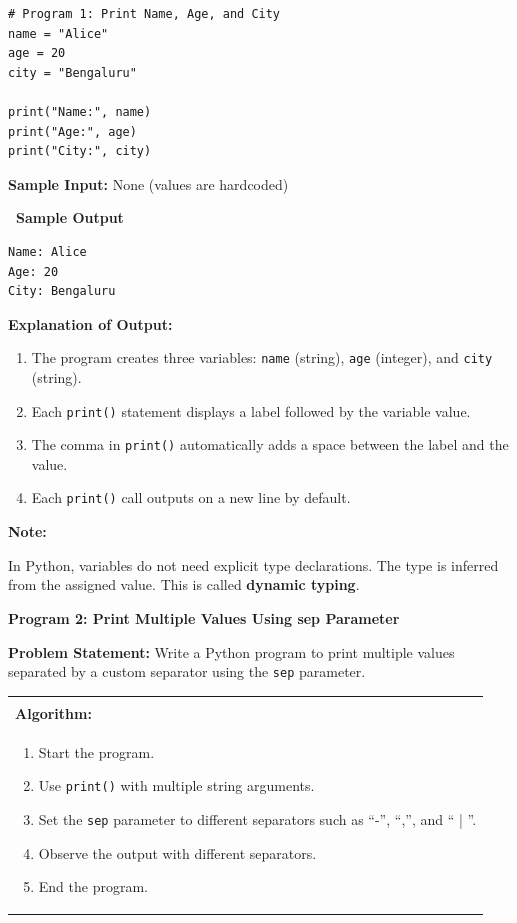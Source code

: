 \documentclass[12pt,a4paper]{article}
\makeatletter
\newcommand{\outhead}{\noindent\colorbox{cmrgreen!25}%
  {\textbf{\small\color{cmrdark}~Sample Output~}}\par\vspace{-1pt}}
\newenvironment{notebox}{%
  \par\vspace{4pt}%
  \noindent\textbf{Note:}\par\vspace{2pt}%
  \begin{minipage}{\linewidth}%
  \small%
}{%
  \end{minipage}\par\vspace{4pt}%
}
\newenvironment{algobox}{%
  \par\vspace{4pt}%
  \noindent\begin{tabular}{@{}p{\linewidth}@{}}%
  \hline\\[-8pt]%
  \textbf{\color{blue!60!black}\small Algorithm:}\\[2pt]%
}{%
  \\[-4pt]\hline%
  \end{tabular}\par\vspace{4pt}%
}
\makeatother
\begin{document}
\begin{lstlisting}
# Program 1: Print Name, Age, and City
name = "Alice"
age = 20
city = "Bengaluru"

print("Name:", name)
print("Age:", age)
print("City:", city)
\end{lstlisting}

\textbf{Sample Input:} None (values are hardcoded)

\outhead
\begin{lstlisting}[style=outputstyle]
Name: Alice
Age: 20
City: Bengaluru
\end{lstlisting}

\textbf{Explanation of Output:}
\begin{enumerate}
  \item The program creates three variables: \texttt{name} (string), \texttt{age} (integer), and \texttt{city} (string).
  \item Each \texttt{print()} statement displays a label followed by the variable value.
  \item The comma in \texttt{print()} automatically adds a space between the label and the value.
  \item Each \texttt{print()} call outputs on a new line by default.
\end{enumerate}

\begin{notebox}
In Python, variables do not need explicit type declarations. The type is inferred from the assigned value. This is called \textbf{dynamic typing}.
\end{notebox}

\vspace{0.5cm}

\textbf{Program 2: Print Multiple Values Using sep Parameter}

\textbf{Problem Statement:}
Write a Python program to print multiple values separated by a custom separator using the \texttt{sep} parameter.

\begin{algobox}
\begin{enumerate}[label=Step \arabic*:]
  \item Start the program.
  \item Use \texttt{print()} with multiple string arguments.
  \item Set the \texttt{sep} parameter to different separators such as ``-'', ``,'', and `` | ''.
  \item Observe the output with different separators.
  \item End the program.
\end{enumerate}
\end{algobox}
\end{document}

